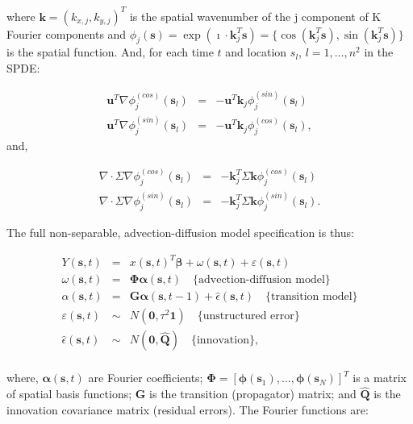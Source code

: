 \documentclass[letterpaper,portrait,11pt]{scrartcl}
\numberwithin{equation}{section}    %
\numberwithin{figure}{section}    %
\numberwithin{table}{section}       %
\begin{document}
\begin{appendices}
  where $\bm{k}=(k_{x,j}, k_{y,j} )^T$ is the spatial wavenumber of the j component of K Fourier components and $\phi_j(\bm{s}) = \exp(\imath \cdot \bm{k}_j^T\bm{s} ) = \{ \cos( \bm{k}_j^T\bm{s}),  \sin( \bm{k}_j^T\bm{s} ) \}$ is the spatial function. And, for each time $t$ and location $s_l$, $l=1,\dots, n^2$ in the SPDE:
  
  \begin{eqnarray*}
    \bm{u}^T \nabla \phi_j^{(cos)}(\bm{s}_l) &=& -\bm{u}^T \bm{k}_j \phi_j^{(sin)} (\bm{s}_l) \\
    \bm{u}^T \nabla \phi_j^{(sin)}(\bm{s}_l) &=& -\bm{u}^T \bm{k}_j \phi_j^{(cos)} (\bm{s}_l),
  \end{eqnarray*}  
 and, 
 
  \begin{eqnarray*}
    \nabla \cdot \Sigma \nabla \phi_j^{(cos)}(\bm{s}_l) &=& -\bm{k}_j^T \Sigma \bm{k} \phi_j^{(cos)} (\bm{s}_l) \\
    \nabla \cdot \Sigma \nabla \phi_j^{(sin)}(\bm{s}_l) &=& -\bm{k}_j^T \Sigma \bm{k} \phi_j^{(sin)} (\bm{s}_l) .
  \end{eqnarray*}  


The full non-separable, advection-diffusion model specification is thus:

  \begin{eqnarray*}
    Y(\bm{s},t) &=& x(\bm{s},t)^{T} \bm{\beta} +  \omega(\bm{s},t) + \varepsilon(\bm{s},t) \\
    \omega(\bm{s},t) &=& \bm{\Phi} \bm{\alpha} (\bm{s},t)  \quad \text{\{advection-diffusion model\}}\\
    \alpha (\bm{s},t)&=& \bm{G} \bm{\alpha} (\bm{s},t-1) + \hat{\epsilon}(\bm{s},t)  \quad \text{\{transition model\}} \\
    \varepsilon(\bm{s},t) &\sim& N(\bm{0}, \tau^2 \bm{1} ) \quad \text{\{unstructured error\}}\\
    \hat{\epsilon}(\bm{s},t) &\sim& N(\bm{0}, \bm{\hat{Q}})  \quad \text{\{innovation\}} , \\
  \end{eqnarray*}  
  
 where, $\bm{\alpha} (\bm{s},t)$ are Fourier coefficients; $\bm{\Phi}=[ \bm{\phi}(\bm{s}_1), \dots, \bm{\phi}(\bm{s}_N) ]^T$ is a matrix of spatial basis functions; $\bm{G}$ is the transition (propagator) matrix; and $\bm{\hat{Q}}$ is the  innovation covariance matrix (residual errors). The Fourier functions are:
 

\end{appendices}
\end{document}
